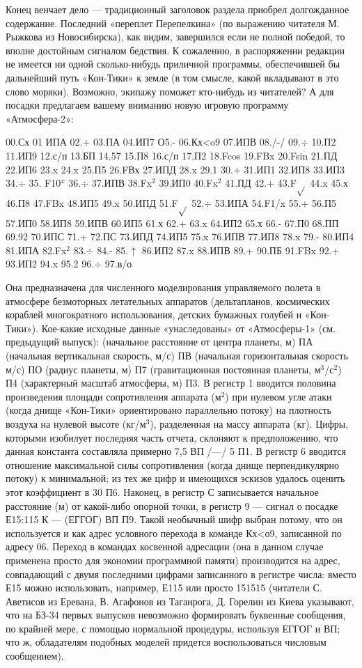 \documentclass[11pt,a4paper,oneside]{article}
\begin{document}
Конец венчает дело — традиционный заголовок раздела приобрел долгожданное содержание. Последний «переплет Перепелкина» (по выражению читателя М. Рыжкова из Новосибирска), как видим, завершился если не полной победой, то вполне достойным сигналом бедствия. К сожалению, в распоряжении редакции не имеется ни одной сколько-нибудь приличной программы, обеспечившей бы дальнейший путь «Кон-Тики» к земле (в том смысле, какой вкладывают в это слово моряки). Возможно, экипажу поможет кто-нибудь из читателей? А для посадки предлагаем вашему вниманию новую игровую программу «Атмосфера-2»:

00.Сх 01 ИПА 02.+ 03.ПА 04.ИП7 О5.- 06.Кх<o9
07.ИПВ 08./-/ 09.$\div$ 10.П2 11.ИП9 12.с/п 13.БП
14.57 15.П8 16.с/п 17.П2 18.Fcos 19.FBx
20.Fsin 21.ПД 22.ИП6 23.x 24.x 25.П5
26.FВх 27.ИПД 28.x 29.1 30.+ 31.ИП1 32.ИП8
33.ИП3 34.$\div$ 35. F10$^{x}$ 36.$\div$ 37.ИПВ 38.Fx$^{2}$
39.ИП0 40.Fx$^{2}$ 41.ПД 42.+ 43.F$\sqrt{}$ 44.x 45.х
46.П8 47.FBx 48.ИП5 49.x 50.ИПД 51.F$\sqrt{}$
52.$\div$ 53.ИПА 54.F1/x 55.+ 56.П5 57.ИП0
58.ИП8 59.ИПВ 60.ИП5 61.х 62.+ 63.x
64.ИП2 65.х 66.- 67.П0 68.ПП 69.92
70.ИПС 71.+ 72.ПС 73.ИПД 74.ИП5 75.x
76.ИПВ 77.ИП8 78.x 79.- 80.ИП4 81.ИПА
82.Fx$^{2}$ 83.$\div$ 84.- 85.$\uparrow$ 86.ИП2 87.x 88.ИПВ
89.+ 90.ПБ 91.FBx 92.+ 93.ИП2 94.x
95.2 96.$\div$ 97.в/о

Она предназначена для численного моделирования управляемого полета в атмосфере безмоторных летательных аппаратов (дельтапланов, космических кораблей многократного использования, детских бумажных голубей и «Кон-Тики»). Кое-какие исходные данные «унаследованы» от «Атмосферы-1» (см. предыдущий выпуск): (начальное расстояние от центра планеты, м) ПА (начальная вертикальная скорость, м/с) ПВ (начальная горизонтальная скорость м/с) ПО (радиус планеты, м) П7 (гравитационная постоянная планеты, м$^{3}$/с$^{2}$) П4 (характерный масштаб атмосферы, м) П3. В регистр 1 вводится половина произведения площади сопротивления аппарата (м$^{2}$) при нулевом угле атаки (когда днище «Кон-Тики» ориентировано параллельно потоку) на плотность воздуха на нулевой высоте (кг/м$^{3}$), разделенная на массу аппарата (кг). Цифры, которыми изобилует последняя часть отчета, склоняют к предположению, что данная константа составляла примерно 7,5 ВП /—/ 5 П1. В регистр 6 вводится отношение максимальной силы сопротивления (когда днище перпендикулярно потоку) к минимальной; из тех же цифр и имеющихся эскизов удалось оценить этот коэффициент в 30 П6. Наконец, в регистр С записывается начальное расстояние (м) от какой-либо опорной точки, в регистр 9 — сигнал о посадке Е15:115 К — (ЕГГОГ) ВП П9. Такой необычный шифр выбран потому, что он используется и как адрес условного перехода в команде Кх<о9, записанной по адресу 06. Переход в командах косвенной адресации (она в данном случае применена просто для экономии программной памяти) производится на адрес, совпадающий с двумя последними цифрами записанного в регистре числа: вместо Е15 можно использовать, например, Е115 или просто 151515 (читатели С. Аветисов из Еревана, В. Агафонов из Таганрога, Д. Горелин из Киева указывают, что на БЗ-34 первых выпусков невозможно формировать буквенные сообщения, по крайней мере, с помощью нормальной процедуры, используя ЕГГОГ и ВП; что ж, обладателям подобных моделей придется воспользоваться числовым сообщением).
\end{document}

